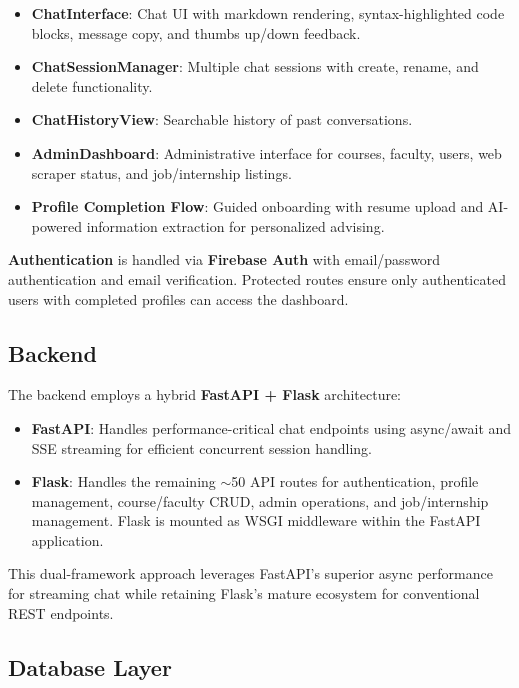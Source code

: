 \documentclass[conference,compsoc]{IEEEtran}
\begin{document}
\begin{itemize}
    \item \textbf{ChatInterface}: Chat UI with markdown rendering, syntax-highlighted code blocks, message copy, and thumbs up/down feedback.
    \item \textbf{ChatSessionManager}: Multiple chat sessions with create, rename, and delete functionality.
    \item \textbf{ChatHistoryView}: Searchable history of past conversations.
    \item \textbf{AdminDashboard}: Administrative interface for courses, faculty, users, web scraper status, and job/internship listings.
    \item \textbf{Profile Completion Flow}: Guided onboarding with resume upload and AI-powered information extraction for personalized advising.
\end{itemize}

\textbf{Authentication} is handled via \textbf{Firebase Auth} with email/password authentication and email verification. Protected routes ensure only authenticated users with completed profiles can access the dashboard.

\subsection{Backend}

The backend employs a hybrid \textbf{FastAPI + Flask} architecture:

\begin{itemize}
    \item \textbf{FastAPI}: Handles performance-critical chat endpoints using async/await and SSE streaming for efficient concurrent session handling.
    \item \textbf{Flask}: Handles the remaining ${\sim}$50 API routes for authentication, profile management, course/faculty CRUD, admin operations, and job/internship management. Flask is mounted as WSGI middleware within the FastAPI application.
\end{itemize}

This dual-framework approach leverages FastAPI's superior async performance for streaming chat while retaining Flask's mature ecosystem for conventional REST endpoints.

\subsection{Database Layer}
\end{document}
